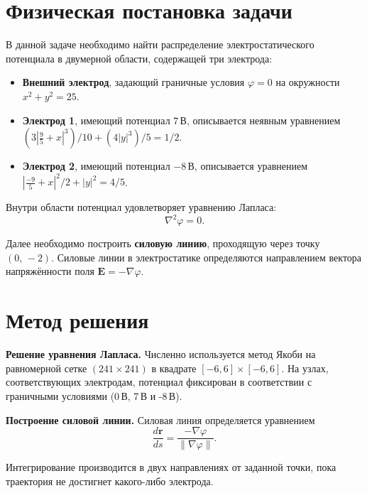 \documentclass[12pt]{article}
\begin{document}
\section*{Физическая постановка задачи}

В данной задаче необходимо найти распределение электростатического потенциала в двумерной области, содержащей три электрода:

\begin{itemize}
    \item \textbf{Внешний электрод}, задающий граничные условия \( \varphi = 0 \) на окружности \( x^2 + y^2 = 25 \).
    \item \textbf{Электрод 1}, имеющий потенциал \( 7\,\text{В} \), описывается неявным уравнением \( (3|\tfrac{9}{5}+x|^3)/10 + (4|y|^3)/5 = 1/2 \).
    \item \textbf{Электрод 2}, имеющий потенциал \( -8\,\text{В} \), описывается уравнением \( |\tfrac{-9}{5} + x|^2/2 + |y|^2 = 4/5 \).
\end{itemize}

Внутри области потенциал удовлетворяет уравнению Лапласа:
\[
\nabla^2 \varphi = 0.
\]

Далее необходимо построить \textbf{силовую линию}, проходящую через точку \((0,\,-2)\). Силовые линии в электростатике определяются направлением вектора напряжённости поля \(\mathbf{E} = - \nabla \varphi\).

\section*{Метод решения}

\textbf{Решение уравнения Лапласа.} Численно используется метод Якоби на равномерной сетке \((241\times241)\) в квадрате \([-6,6]\times[-6,6]\). На узлах, соответствующих электродам, потенциал фиксирован в соответствии с граничными условиями (0\,В, 7\,В и -8\,В).

\textbf{Построение силовой линии.} Силовая линия определяется уравнением
\[
\frac{d\mathbf{r}}{ds} = \frac{-\nabla \varphi}{\|\nabla \varphi\|}.
\]

Интегрирование производится в двух направлениях от заданной точки, пока траектория не достигнет какого-либо электрода.

\end{document}
